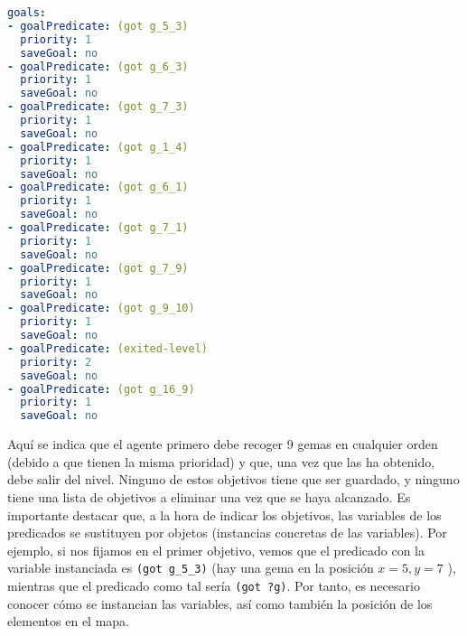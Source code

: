 \begin{enumerate}
    \begin{lstlisting}[language=yaml]
goals:
- goalPredicate: (got g_5_3)
  priority: 1
  saveGoal: no
- goalPredicate: (got g_6_3)
  priority: 1
  saveGoal: no
- goalPredicate: (got g_7_3)
  priority: 1
  saveGoal: no
- goalPredicate: (got g_1_4)
  priority: 1
  saveGoal: no
- goalPredicate: (got g_6_1)
  priority: 1
  saveGoal: no
- goalPredicate: (got g_7_1)
  priority: 1
  saveGoal: no
- goalPredicate: (got g_7_9)
  priority: 1
  saveGoal: no
- goalPredicate: (got g_9_10)
  priority: 1
  saveGoal: no
- goalPredicate: (exited-level)
  priority: 2
  saveGoal: no
- goalPredicate: (got g_16_9)
  priority: 1
  saveGoal: no
    \end{lstlisting}
    
    Aquí se indica que el agente primero debe recoger 9 gemas en cualquier orden (debido a que tienen la misma
    prioridad) y que, una vez que las ha obtenido, debe salir del nivel. Ninguno de estos objetivos tiene que ser
    guardado, y ninguno tiene una lista de objetivos a eliminar una vez que se haya alcanzado. Es importante destacar
    que, a la hora de indicar los objetivos, las variables de los predicados se sustituyen por objetos (instancias
    concretas de las variables). Por ejemplo, si nos fijamos en el primer objetivo, vemos que el predicado con la
    variable instanciada es \texttt{(got g\_5\_3)} (hay una gema en la posición $x = 5, y= 7$ ), mientras que el
    predicado como tal sería \texttt{(got ?g)}. Por tanto, es necesario conocer cómo se instancian las variables,
    así como también la posición de los elementos en el mapa.
\end{enumerate}